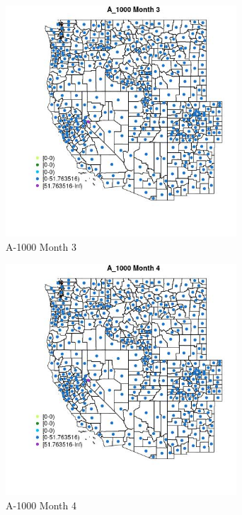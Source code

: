 \begin{figure} 
\centering  
\includegraphics[width=0.77\textwidth]{Code_Outputs/df_report_ML_predictors_CountyCentroid_Locations_Dates_2008-01-01to2018-12-31_MapObsMo3A_1000.jpg} 
\caption{\label{fig:df_report_ML_predictors_CountyCentroid_Locations_Dates_2008-01-01to2018-12-31MapObsMo3A_1000}A-1000 Month 3} 
\end{figure} 
 

\clearpage 

\begin{figure} 
\centering  
\includegraphics[width=0.77\textwidth]{Code_Outputs/df_report_ML_predictors_CountyCentroid_Locations_Dates_2008-01-01to2018-12-31_MapObsMo4A_1000.jpg} 
\caption{\label{fig:df_report_ML_predictors_CountyCentroid_Locations_Dates_2008-01-01to2018-12-31MapObsMo4A_1000}A-1000 Month 4} 
\end{figure} 
 

